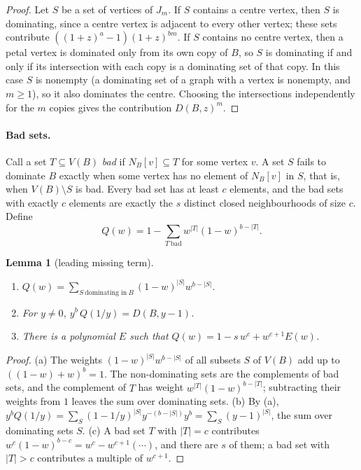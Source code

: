 \documentclass[11pt]{article}
\newtheorem{lemma}{Lemma}
\theoremstyle{definition}
\theoremstyle{remark}
\begin{document}
\begin{proof}
Let $S$ be a set of vertices of $J_m$. If $S$ contains a centre vertex, then
$S$ is dominating, since a centre vertex is adjacent to every other vertex;
these sets contribute $((1+z)^a-1)(1+z)^{bm}$. If $S$ contains no centre
vertex, then a petal vertex is dominated only from its own copy of $B$, so
$S$ is dominating if and only if its intersection with each copy is a
dominating set of that copy. In this case $S$ is nonempty (a dominating set
of a graph with a vertex is nonempty, and $m\ge1$), so it also dominates the
centre. Choosing the intersections independently for the $m$ copies gives the
contribution $D(B,z)^m$.
\end{proof}

\paragraph{Bad sets.}
Call a set $T\subseteq V(B)$ \emph{bad} if $N_B[v]\subseteq T$ for some vertex
$v$. A set $S$ fails to dominate $B$ exactly when some vertex has no element
of $N_B[v]$ in $S$, that is, when $V(B)\setminus S$ is bad. Every bad set has
at least $c$ elements, and the bad sets with exactly $c$ elements are exactly
the $s$ distinct closed neighbourhoods of size $c$. Define
\[
Q(w)=1-\sum_{T\ \text{bad}} w^{|T|}(1-w)^{b-|T|}.
\]

\begin{lemma}[leading missing term]\label{lem:Q}
\begin{enumerate}
\item[(a)] $Q(w)=\sum_{S\ \text{dominating in}\ B}(1-w)^{|S|}w^{b-|S|}$.
\item[(b)] For $y\ne0$, $y^b\,Q(1/y)=D(B,y-1)$.
\item[(c)] There is a polynomial $E$ such that
$Q(w)=1-s\,w^c+w^{c+1}E(w)$.
\end{enumerate}
\end{lemma}

\begin{proof}
(a) The weights $(1-w)^{|S|}w^{b-|S|}$ of all subsets $S$ of $V(B)$ add up to
$((1-w)+w)^b=1$. The non-dominating sets are the complements of bad sets, and
the complement of $T$ has weight $w^{|T|}(1-w)^{b-|T|}$; subtracting their
weights from $1$ leaves the sum over dominating sets. (b) By (a),
$y^bQ(1/y)=\sum_S (1-1/y)^{|S|}y^{-(b-|S|)}y^b=\sum_S (y-1)^{|S|}$, the sum over
dominating sets $S$. (c) A bad set $T$ with $|T|=c$ contributes
$w^c(1-w)^{b-c}=w^c-w^{c+1}(\cdots)$, and there are $s$ of them; a bad set with
$|T|>c$ contributes a multiple of $w^{c+1}$.
\end{proof}
\end{document}
